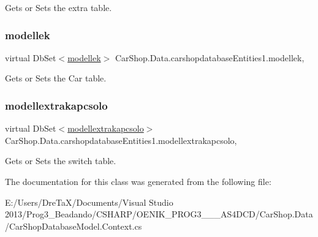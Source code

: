 Gets or Sets the extra table. 

\mbox{\label{class_car_shop_1_1_data_1_1carshopdatabase_entities1_af9944547894d4363c4a5c456bdde184f}} 
\subsubsection{\texorpdfstring{modellek}{modellek}}
{\footnotesize\ttfamily virtual Db\+Set$<$\mbox{\hyperlink{class_car_shop_1_1_data_1_1modellek}{modellek}}$>$ Car\+Shop.\+Data.\+carshopdatabase\+Entities1.\+modellek\hspace{0.3cm}{\ttfamily [get]}, {\ttfamily [set]}}



Gets or Sets the Car table. 

\mbox{\label{class_car_shop_1_1_data_1_1carshopdatabase_entities1_a94585ff2ba793f43179a47daa0bc92ce}} 
\subsubsection{\texorpdfstring{modellextrakapcsolo}{modellextrakapcsolo}}
{\footnotesize\ttfamily virtual Db\+Set$<$\mbox{\hyperlink{class_car_shop_1_1_data_1_1modellextrakapcsolo}{modellextrakapcsolo}}$>$ Car\+Shop.\+Data.\+carshopdatabase\+Entities1.\+modellextrakapcsolo\hspace{0.3cm}{\ttfamily [get]}, {\ttfamily [set]}}



Gets or Sets the switch table. 



The documentation for this class was generated from the following file\+:\begin{DoxyCompactItemize}
\item 
E\+:/\+Users/\+Dre\+Ta\+X/\+Documents/\+Visual Studio 2013/\+Prog3\+\_\+\+Beadando/\+C\+S\+H\+A\+R\+P/\+O\+E\+N\+I\+K\+\_\+\+P\+R\+O\+G3\+\_\+\_\+\_\+\+A\+S4\+D\+C\+D/\+Car\+Shop.\+Data/Car\+Shop\+Database\+Model.\+Context.\+cs\end{DoxyCompactItemize}
